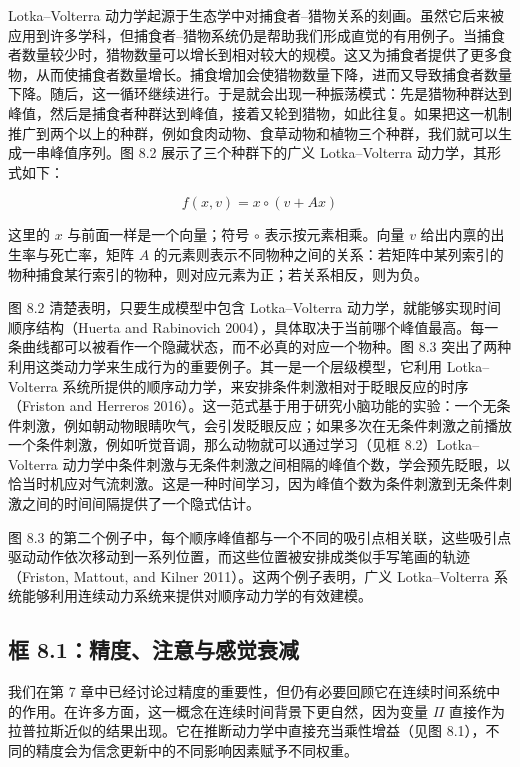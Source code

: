 Lotka--Volterra 动力学起源于生态学中对捕食者--猎物关系的刻画。虽然它后来被应用到许多学科，但捕食者--猎物系统仍是帮助我们形成直觉的有用例子。当捕食者数量较少时，猎物数量可以增长到相对较大的规模。这又为捕食者提供了更多食物，从而使捕食者数量增长。捕食增加会使猎物数量下降，进而又导致捕食者数量下降。随后，这一循环继续进行。于是就会出现一种振荡模式：先是猎物种群达到峰值，然后是捕食者种群达到峰值，接着又轮到猎物，如此往复。如果把这一机制推广到两个以上的种群，例如食肉动物、食草动物和植物三个种群，我们就可以生成一串峰值序列。图 8.2 展示了三个种群下的广义 Lotka--Volterra 动力学，其形式如下：

\[
f(x,v) = x \circ (v + Ax)
\tag{8.6}
\]

这里的 $x$ 与前面一样是一个向量；符号 $\circ$ 表示按元素相乘。向量 $v$ 给出内禀的出生率与死亡率，矩阵 $A$ 的元素则表示不同物种之间的关系：若矩阵中某列索引的物种捕食某行索引的物种，则对应元素为正；若关系相反，则为负。

图 8.2 清楚表明，只要生成模型中包含 Lotka--Volterra 动力学，就能够实现时间顺序结构（Huerta and Rabinovich 2004），具体取决于当前哪个峰值最高。每一条曲线都可以被看作一个隐藏状态，而不必真的对应一个物种。图 8.3 突出了两种利用这类动力学来生成行为的重要例子。其一是一个层级模型，它利用 Lotka--Volterra 系统所提供的顺序动力学，来安排条件刺激相对于眨眼反应的时序（Friston and Herreros 2016）。这一范式基于用于研究小脑功能的实验：一个无条件刺激，例如朝动物眼睛吹气，会引发眨眼反应；如果多次在无条件刺激之前播放一个条件刺激，例如听觉音调，那么动物就可以通过学习（见框 8.2）Lotka--Volterra 动力学中条件刺激与无条件刺激之间相隔的峰值个数，学会预先眨眼，以恰当时机应对气流刺激。这是一种时间学习，因为峰值个数为条件刺激到无条件刺激之间的时间间隔提供了一个隐式估计。

图 8.3 的第二个例子中，每个顺序峰值都与一个不同的吸引点相关联，这些吸引点驱动动作依次移动到一系列位置，而这些位置被安排成类似手写笔画的轨迹（Friston, Mattout, and Kilner 2011）。这两个例子表明，广义 Lotka--Volterra 系统能够利用连续动力系统来提供对顺序动力学的有效建模。

\subsection{框 8.1：精度、注意与感觉衰减}

我们在第 7 章中已经讨论过精度的重要性，但仍有必要回顾它在连续时间系统中的作用。在许多方面，这一概念在连续时间背景下更自然，因为变量 $\Pi$ 直接作为拉普拉斯近似的结果出现。它在推断动力学中直接充当乘性增益（见图 8.1），不同的精度会为信念更新中的不同影响因素赋予不同权重。

